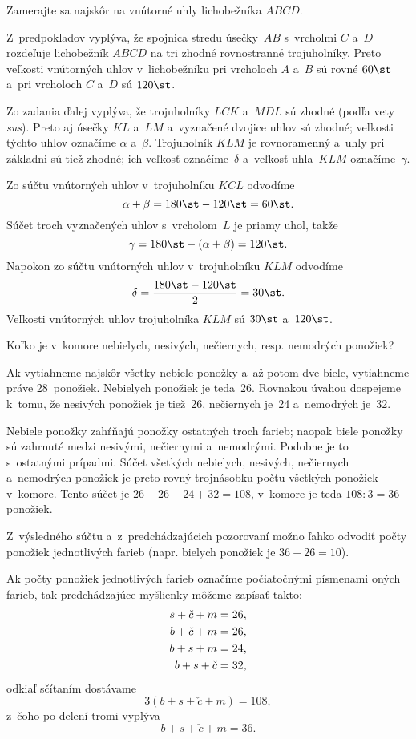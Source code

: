 {%
\napad
Zamerajte sa najskôr na vnútorné uhly lichobežníka $ABCD$.

\riesenie
Z~predpokladov vyplýva, že spojnica stredu úsečky~$AB$ s~vrcholmi $C$ a~$D$ rozdeľuje lichobežník $ABCD$ na tri zhodné rovnostranné trojuholníky.
Preto veľkosti vnútorných uhlov v~lichobežníku pri vrcholoch $A$ a~$B$ sú rovné $60\st$ a~pri vrcholoch $C$ a~$D$ sú $120\st$.

Zo zadania ďalej vyplýva, že trojuholníky $LCK$ a~$MDL$ sú zhodné
(podľa vety {\it sus\/}).
Preto aj úsečky $KL$ a~$LM$ a~vyznačené dvojice uhlov sú zhodné;
veľkosti týchto uhlov označíme $\alpha$ a~$\beta$.
Trojuholník $KLM$ je rovnoramenný a~uhly pri základni sú tiež zhodné;
ich veľkosť označíme~$\delta$ a~veľkosť uhla~$KLM$ označíme~$\gamma$.
%


Zo súčtu vnútorných uhlov v~trojuholníku $KCL$ odvodíme
$$
\alpha+\beta=180\st-120\st=60\st.
$$
Súčet troch vyznačených uhlov s~vrcholom~$L$ je priamy uhol, takže
$$
\gamma=180\st-(\alpha+\beta)=120\st.
$$
Napokon zo súčtu vnútorných uhlov v~trojuholníku $KLM$ odvodíme
$$
\delta=\frac{180\st-120\st}2=30\st.
$$
Veľkosti vnútorných uhlov trojuholníka $KLM$ sú $30\st$ a~$120\st$.}

{%
\napad
Koľko je v~komore nebielych, nesivých, nečiernych, resp. nemodrých ponožiek?

\riesenie
Ak vytiahneme najskôr všetky nebiele ponožky a~až potom dve biele,
vytiahneme práve 28~ponožiek.
Nebielych ponožiek je teda~26.
Rovnakou úvahou dospejeme k~tomu, že nesivých ponožiek je tiež~26, nečiernych je~24
a~nemodrých je~32.

Nebiele ponožky zahŕňajú ponožky ostatných troch farieb; naopak biele ponožky sú zahrnuté medzi nesivými, nečiernymi a~nemodrými.
Podobne je to s~ostatnými prípadmi.
Súčet všetkých nebielych, nesivých, nečiernych a~nemodrých ponožiek je preto rovný trojnásobku počtu všetkých ponožiek v~komore.
Tento súčet je $26+26+24+32=108$, v~komore je teda $108:3=36$ ponožiek.

\poznamky
Z~výsledného súčtu a~z~predchádzajúcich pozorovaní možno ľahko odvodiť počty ponožiek
jednotlivých farieb
(napr. bielych ponožiek je $36-26=10$).

\smallskip
Ak počty ponožiek jednotlivých farieb označíme počiatočnými písmenami oných farieb,
tak predchádzajúce myšlienky môžeme zapísať takto:
$$
\aligned
s+\check{c}+m &=26, \\
b+\check{c}+m &=26, \\
b+s+m &=24, \\
b+s+\check{c} &=32,
\endaligned
$$
odkiaľ sčítaním dostávame
$$
3(b+s+\check{c}+m) =108,
$$
z~čoho po delení tromi vyplýva
$$
b+s+\check{c}+m=36.
$$}

